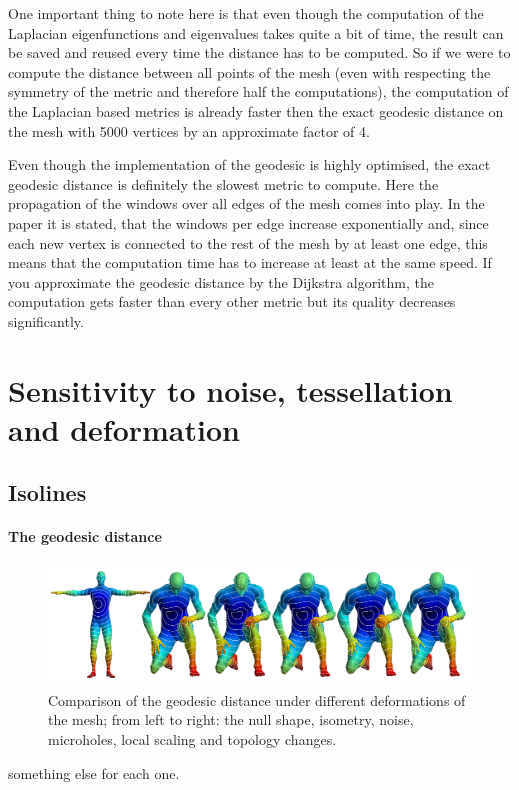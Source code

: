 One important thing to note here is that even though the computation of the Laplacian eigenfunctions and eigenvalues takes quite a bit of time, the result can be saved and reused every time the distance has to be computed.
So if we were to compute the distance between all points of the mesh (even with respecting the symmetry of the metric and therefore half the computations), the computation of the Laplacian based metrics is already faster then the exact geodesic distance on the mesh with 5000 vertices by an approximate factor of 4.

Even though the implementation of the geodesic is highly optimised, the exact geodesic distance is definitely the slowest metric to compute.
Here the propagation of the windows over all edges of the mesh comes into play.
In the paper \cite{surazhsky2005fast} it is stated, that the windows per edge increase exponentially and, since each new vertex is connected to the rest of the mesh by at least one edge, this means that the computation time has to increase at least at the same speed.
If you approximate the geodesic distance by the Dijkstra algorithm, the computation gets faster than every other metric but its quality decreases significantly.

\section{Sensitivity to noise, tessellation and deformation}

\subsection{Isolines}
\paragraph{The geodesic distance}
\begin{figure}[h]
	\centering
	\includegraphics[width = \textwidth]{../results/geodesic_isolines}
	\caption{Comparison of the geodesic distance under different deformations of the mesh; from left to right: the null shape, isometry, noise, microholes, local scaling and topology changes.}
	\label{fig:geo_isolines}
\end{figure}
something else for each one.

